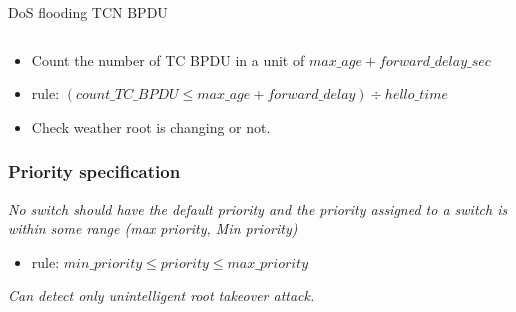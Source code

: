 \documentclass[10pt, blue,subsection=true, compress]{beamer}
\begin{document}
\begin{frame}
\begin{columns}[t]
\begin{block}{DoS flooding TCN BPDU}
\end{block}   
  
\end{columns}
\begin{itemize} \item Count the number of TC BPDU in a unit of \begin{math} max\_age + forward\_delay\_sec \end{math}
\item rule: \begin{math} (count\_TC\_BPDU \leq max\_age + forward\_delay) \div hello\_time \end{math}
 \item Check  weather root is changing or not.
\end{itemize}

\end{frame} 

\begin{frame} \frametitle{Priority specification}
\emph{No switch should have the default priority and the priority assigned to a switch is within some range (max priority, Min priority)}
\vspace{ 5 mm}
\begin{itemize}
\item        rule: \begin{math} min\_priority \leq priority \leq max\_priority \end{math}
\end{itemize}
\vspace{1 mm}
\emph{Can detect only unintelligent root takeover attack.}

\end{frame} 
\end{document}
